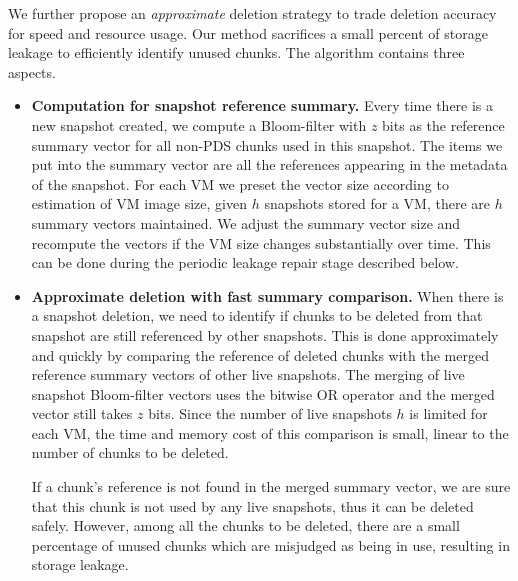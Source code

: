We further propose an {\em approximate} deletion strategy to trade deletion accuracy for
speed and resource usage. Our method sacrifices a small percent of storage leakage
to efficiently identify unused chunks.
The algorithm contains three aspects.
\begin{itemize}
\item {\bf Computation for snapshot reference summary.}
Every time there is a new snapshot created,
we compute a Bloom-filter with $z$ bits as the reference summary vector for all non-PDS chunks used 
in this snapshot.
The items we put into the summary vector are all the references appearing in the metadata of the snapshot.
For each VM we preset the vector size according to  estimation of VM image size,
given $h$ snapshots stored for a VM, there are $h$ summary vectors maintained.
We adjust the summary vector size and recompute the vectors if the VM size changes substantially over time.
This can be done during the periodic leakage repair stage described below.

\item {\bf Approximate deletion with fast summary comparison.}
When there is a snapshot deletion,  
we need to identify if chunks to be deleted from that snapshot
are still referenced by other snapshots. 
This is done approximately and quickly by comparing the 
reference of deleted chunks  with
the merged reference summary vectors of other live snapshots.
The merging of live snapshot Bloom-filter vectors uses the bitwise OR operator 
and the merged vector still takes $z$ bits.
Since the number of live snapshots $h$ is limited for
each VM, 
the time and memory cost of this comparison is small, linear to the number of chunks to be deleted.

If a chunk's reference is not found in the merged summary vector, we are sure that
this chunk is not used by any live snapshots, thus it can be deleted safely.
However, among all the chunks to be deleted, 
there are a small percentage of unused chunks  which
are misjudged as  being in use, resulting in storage leakage.


\end{itemize}
